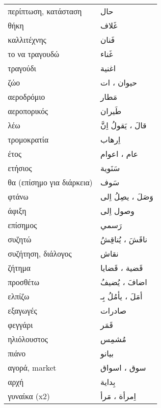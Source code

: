 \documentclass[twocolumn,a4paper]{article}
\newcommand{\ar}[1]{\textarabic{#1}}
\newcommand{\pl}{\raisebox{0.15ex}{\footnotesize ◍}}
\newcommand{\normpl}[1]{\ar{ #1، ات }}
\newcommand{\vrf}{\raisebox{0.15ex}{\footnotesize ◉}}
\newcommand{\mas}{\raisebox{0.15ex}{\footnotesize ◫}}
\begin{document}
\begin{mpsupertabular}{ P{0.5\textwidth} P{0.5\textwidth} }
περίπτωση, κατάσταση         & \ar{ حال } \\
θήκη                         & \ar{ غَلاف } \\
καλλιτέχνης                  & \ar{ فَنان } \\
το να τραγουδώ  \mas         & \ar{ غَناء } \\
τραγούδι                     & \ar{ اغنية } \\
ζώο \pl                      & \normpl{ حيوان } \\
αεροδρόμιο                   & \ar{ مَطار } \\
αεροπορικός                  & \ar{ طَيران } \\

λέω \vrf                     & \ar{ قالَ ، يَقولُ اِنَّ } \\ %
τρομοκρατία                  & \ar{ اِرهاب } \\
έτος \pl                     & \ar{ عام ، اعوام } \\
ετήσιος                      & \ar{ سَنَوية } \\
θα (επίσημο για διάρκεια)    & \ar{ سَوف } \\
φτάνω \vrf                   & \ar{ وَصَلَ ، يصِلُ اِلى } \\ %
άφιξη \mas                   & \ar{ وصول اِلى } \\
επίσημος                     & \ar{ رَسمي } \\
συζητώ \vrf                  & \ar{ ناقَشَ ، يُناقِشُ } \\ %
συζήτηση, διάλογος \mas      & \ar{ نقاش } \\ %
ζήτημα  \pl                  & \ar{ قَضية ، قَضايا } \\
προσθέτω \vrf                & \ar{ اضافَ ، يُضيفُ } \\ %
ελπίζω \vrf                  & \ar{ أمَلَ ، يأمُلُ بِـ } \\ %
εξαγωγές                     & \ar{ صادرات } \\
φεγγάρι                      & \ar{ قَمَر } \\
ηλιόλουστος                  & \ar{ مُشمِس } \\
πιάνο                        & \ar{ بيانو } \\
αγορά, market \pl            & \ar{ سوق ، اسواق } \\
αρχή                         & \ar{ بِداية } \\
γυναίκα (x2)                 & \ar{ اِمرأة ، مَرأ } \\

\end{mpsupertabular}
\end{document}
